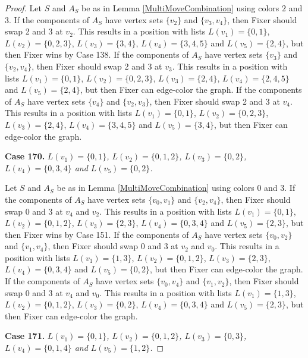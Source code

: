 \documentclass[12pt]{amsart}
\theoremstyle{plain}
\theoremstyle{definition}
\theoremstyle{remark}
\begin{document}
\begin{proof}
Let $S$ and $A_S$ be as in Lemma \ref{MultiMoveCombination} using colors $2$ and $3$. If the components of $A_S$ have vertex sets $\{v_2\}$ and $\{v_3, v_4\}$, then Fixer should swap 2 and 3 at $v_2$. This results in a position with lists $L(v_1) = \{0, 1\}$, $L(v_2) = \{0, 2, 3\}$, $L(v_3) = \{3, 4\}$, $L(v_4) = \{3, 4, 5\}$ and $L(v_5) = \{2, 4\}$, but then Fixer wins by Case 138.
If the components of $A_S$ have vertex sets $\{v_3\}$ and $\{v_2, v_4\}$, then Fixer should swap 2 and 3 at $v_3$. This results in a position with lists $L(v_1) = \{0, 1\}$, $L(v_2) = \{0, 2, 3\}$, $L(v_3) = \{2, 4\}$, $L(v_4) = \{2, 4, 5\}$ and $L(v_5) = \{2, 4\}$, but then Fixer can edge-color the graph.
If the components of $A_S$ have vertex sets $\{v_4\}$ and $\{v_2, v_3\}$, then Fixer should swap 2 and 3 at $v_4$. This results in a position with lists $L(v_1) = \{0, 1\}$, $L(v_2) = \{0, 2, 3\}$, $L(v_3) = \{2, 4\}$, $L(v_4) = \{3, 4, 5\}$ and $L(v_5) = \{3, 4\}$, but then Fixer can edge-color the graph.

\noindent\textbf{Case 170.  }\textit{$L(v_1) = \{0, 1\}$, $L(v_2) = \{0, 1, 2\}$, $L(v_3) = \{0, 2\}$, $L(v_4) = \{0, 3, 4\}$ and $L(v_5) = \{0, 2\}$.}

Let $S$ and $A_S$ be as in Lemma \ref{MultiMoveCombination} using colors $0$ and $3$. If the components of $A_S$ have vertex sets $\{v_0, v_1\}$ and $\{v_2, v_4\}$, then Fixer should swap 0 and 3 at $v_4$ and $v_2$. This results in a position with lists $L(v_1) = \{0, 1\}$, $L(v_2) = \{0, 1, 2\}$, $L(v_3) = \{2, 3\}$, $L(v_4) = \{0, 3, 4\}$ and $L(v_5) = \{2, 3\}$, but then Fixer wins by Case 151.
If the components of $A_S$ have vertex sets $\{v_0, v_2\}$ and $\{v_1, v_4\}$, then Fixer should swap 0 and 3 at $v_2$ and $v_0$. This results in a position with lists $L(v_1) = \{1, 3\}$, $L(v_2) = \{0, 1, 2\}$, $L(v_3) = \{2, 3\}$, $L(v_4) = \{0, 3, 4\}$ and $L(v_5) = \{0, 2\}$, but then Fixer can edge-color the graph.
If the components of $A_S$ have vertex sets $\{v_0, v_4\}$ and $\{v_1, v_2\}$, then Fixer should swap 0 and 3 at $v_4$ and $v_0$. This results in a position with lists $L(v_1) = \{1, 3\}$, $L(v_2) = \{0, 1, 2\}$, $L(v_3) = \{0, 2\}$, $L(v_4) = \{0, 3, 4\}$ and $L(v_5) = \{2, 3\}$, but then Fixer can edge-color the graph.

\noindent\textbf{Case 171.  }\textit{$L(v_1) = \{0, 1\}$, $L(v_2) = \{0, 1, 2\}$, $L(v_3) = \{0, 3\}$, $L(v_4) = \{0, 1, 4\}$ and $L(v_5) = \{1, 2\}$.}


\end{proof}
\end{document}
